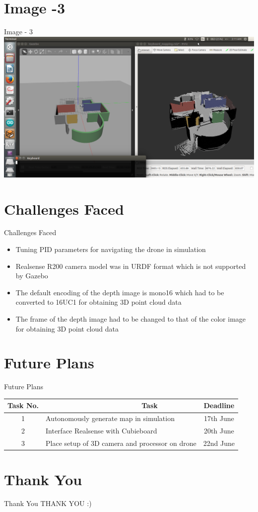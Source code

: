 \documentclass[10pt, a4paper]{beamer}
\begin{document}
\section{Image -3}
\begin{frame}{Image - 3}
\includegraphics[scale = 0.2]{3.png}
\end{frame}

\section{Challenges Faced}
\begin{frame}{Challenges Faced}
	\begin{itemize}
		\item Tuning PID parameters for navigating the drone in simulation
		\item Realsense R200 camera model was in URDF format which is not supported by Gazebo
		\item The default encoding of the depth image is mono16 which had to be converted to 16UC1 for obtaining 3D point cloud data
		\item The frame of the depth image had to be changed to that of the color image for obtaining 3D point cloud data
	\end{itemize}
\end{frame}

\section{Future Plans}
\begin{frame}{Future Plans}
\begin{tabular}{| c | p{6.5cm} | c | }
\hline
Task No. & ~~~~~~~~~~~~~~~~~~~~~~~~Task & Deadline\\
\hline
1 & Autonomously generate map in simulation & 17th June\\
\hline
2 & Interface Realsense with Cubieboard & 20th June\\
\hline
3 & Place setup of 3D camera and processor on drone & 22nd June\\
\hline
\end{tabular}
\end{frame}


\section{Thank You}
\begin{frame}{Thank You}
	\centering THANK YOU :)
\end{frame}
\end{document}
